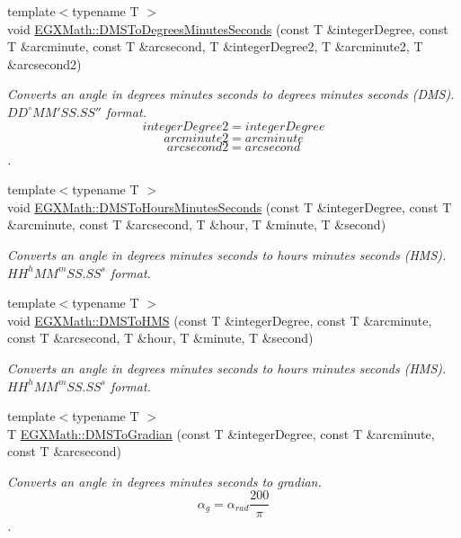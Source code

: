 \begin{DoxyCompactItemize}
{\footnotesize template$<$typename T $>$ }\\void \mbox{\hyperlink{group___e_g_x_math-_conversions-_angle_conversions-_d_m_s_gae8804d622399df85d60c0c8bb5c6ebc5}{E\+G\+X\+Math\+::\+D\+M\+S\+To\+Degrees\+Minutes\+Seconds}} (const T \&integer\+Degree, const T \&arcminute, const T \&arcsecond, T \&integer\+Degree2, T \&arcminute2, T \&arcsecond2)
\begin{DoxyCompactList}\small\item\em Converts an angle in degrees minutes seconds to degrees minutes seconds (D\+MS). ${DD}^{\circ}{MM}'{SS.SS}''$ format. \[integerDegree2 = integerDegree \] \[arcminute2 = arcminute\] \[arcsecond2 = arcsecond\]. \end{DoxyCompactList}\item 
{\footnotesize template$<$typename T $>$ }\\void \mbox{\hyperlink{group___e_g_x_math-_conversions-_angle_conversions-_d_m_s_ga62f95d8bf79b8788ef6d1003f8d6a65f}{E\+G\+X\+Math\+::\+D\+M\+S\+To\+Hours\+Minutes\+Seconds}} (const T \&integer\+Degree, const T \&arcminute, const T \&arcsecond, T \&hour, T \&minute, T \&second)
\begin{DoxyCompactList}\small\item\em Converts an angle in degrees minutes seconds to hours minutes seconds (H\+MS). ${HH}^h{MM}^m{SS.SS}^s$ format. \end{DoxyCompactList}\item 
{\footnotesize template$<$typename T $>$ }\\void \mbox{\hyperlink{group___e_g_x_math-_conversions-_angle_conversions-_d_m_s_ga570e90c6555753cccfcaa55f0e6374ac}{E\+G\+X\+Math\+::\+D\+M\+S\+To\+H\+MS}} (const T \&integer\+Degree, const T \&arcminute, const T \&arcsecond, T \&hour, T \&minute, T \&second)
\begin{DoxyCompactList}\small\item\em Converts an angle in degrees minutes seconds to hours minutes seconds (H\+MS). ${HH}^h{MM}^m{SS.SS}^s$ format. \end{DoxyCompactList}\item 
{\footnotesize template$<$typename T $>$ }\\T \mbox{\hyperlink{group___e_g_x_math-_conversions-_angle_conversions-_d_m_s_ga2abca0654499b46df6ab9592f95b9ef1}{E\+G\+X\+Math\+::\+D\+M\+S\+To\+Gradian}} (const T \&integer\+Degree, const T \&arcminute, const T \&arcsecond)
\begin{DoxyCompactList}\small\item\em Converts an angle in degrees minutes seconds to gradian. \[\alpha_{g}=\alpha_{rad}\frac{200}{\pi}\]. \end{DoxyCompactList}\item 

\end{DoxyCompactItemize}
